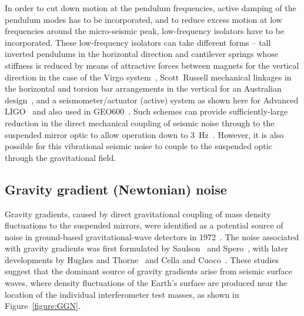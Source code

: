 \documentclass{article}
\begin{document}
In order to cut down motion at the pendulum frequencies, active damping of the
pendulum modes has to be incorporated, and to reduce excess motion at low
frequencies around the micro-seismic peak, low-frequency isolators have to be
incorporated. These low-frequency isolators can take different forms -- tall
inverted pendulums in the horizontal direction and cantilever springs whose
stiffness is reduced by means of attractive forces between magnets for the
vertical direction in the case of the Virgo system~\cite{Losurdo},
Scott~Russell mechanical linkages in the horizontal and torsion bar arrangements
in the vertical for an Australian design~\cite{Winterflood}, and a
seismometer/actuator (active) system as shown here for Advanced
LIGO~\cite{Abbott:2002} and also used in GEO600~\cite{Plissi2}.  Such schemes
can provide sufficiently-large reduction in the direct mechanical coupling of
seismic noise through to the suspended mirror optic to allow operation down to
3~Hz~\cite{Braccini:1993,ETweb}. However, it is also possible for this
vibrational seismic noise to couple to the suspended optic through the
gravitational field.


\subsection{Gravity gradient (Newtonian) noise}
\label{subsection:gravitygradient}

Gravity gradients, caused by direct gravitational coupling of mass density
fluctuations to the suspended mirrors, were identified as a potential source of
noise in ground-based gravitational-wave detectors in 1972~\cite{Weiss}. The
noise associated with gravity gradients was first formulated by
Saulson~\cite{Saulson1} and Spero~\cite{Spero}, with later developments by
Hughes and Thorne~\cite{Thorne:1998} and Cella and Cuoco~\cite{Beccaria}.
These studies suggest that the dominant source of gravity gradients arise from
seismic surface waves, where density fluctuations of the Earth's surface are
produced near the location of the individual interferometer test masses, as
shown in Figure~\ref{figure:GGN}.

\end{document}
